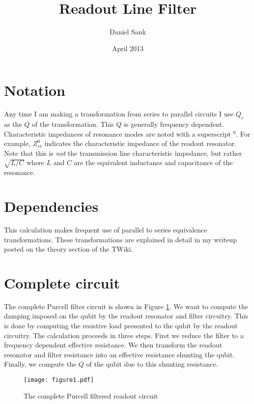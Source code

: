 \documentclass[english,aps,prl]{revtex4}
\begin{document}
\title{Readout Line Filter}

\author{Daniel Sank} 

\date{April 2013}

\maketitle

\section{Notation}
Any time I am making a transformation from series to parallel circuits I use $Q_e$ as the $Q$ of the transformation. This $Q$ is generally frequency dependent. Characteristic impedances of resonance modes are noted with a superscript $^0$. For example, $Z_{rr}^0$ indicates the characteristic impedance of the readout resonator. Note that this is \emph{not} the transmission line characteristic impedance, but rather $\sqrt{L/C}$ where $L$ and $C$ are the equivalent inductance and capacitance of the resonance.

\section{Dependencies}
This calculation makes frequent use of parallel to series equivalence transformations. These transformations are explained in detail in my writeup posted on the theory section of the TWiki.

\section{Complete circuit}

The complete Purcell filter circuit is shown in Figure \ref{Fig:1}. We want to compute the damping imposed on the qubit by the readout resonator and filter circuitry. This is done by computing the resistive load presented to the qubit by the readout circuitry. The calculation proceeds in three steps. First we reduce the filter to a frequency dependent effective resistance. We then transform the readout resonator and filter resistance into an effective resistance shunting the qubit. Finally, we compute the $Q$ of the qubit due to this shunting resistance.

\begin{figure}
\begin{centering}
\texttt{[image: figure1.pdf]} 
\par\end{centering}
\caption{The complete Purcell filtered readout circuit}
\label{Fig:1}
\end{figure}
\end{document}
